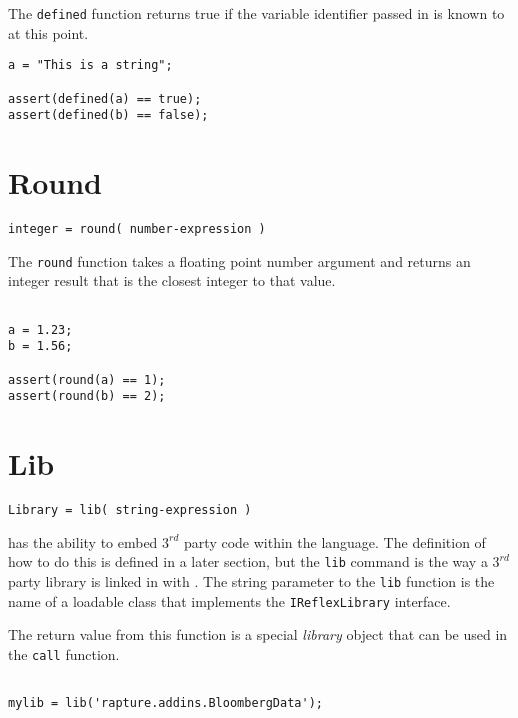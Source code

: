 The \Verb+defined+ function returns true if the variable identifier passed in is known to \Reflex at this point.

\begin{lstlisting}[caption={Defined example}]
a = "This is a string";

assert(defined(a) == true);
assert(defined(b) == false);

\end{lstlisting}

\section{Round}

\begin{Verbatim}
integer = round( number-expression )
\end{Verbatim}

The \Verb+round+ function takes a floating point number argument and returns an integer result that is the closest integer to that value.

\begin{lstlisting}[caption={Round example}]

a = 1.23;
b = 1.56;

assert(round(a) == 1);
assert(round(b) == 2);
\end{lstlisting}

\section{Lib}

\begin{Verbatim}
Library = lib( string-expression )
\end{Verbatim}

\Reflex has the ability to embed $3^{rd}$ party code within the language. The definition of how to do this is defined in a later section, but the \Verb+lib+ command is the way a $3^{rd}$ party library is linked in with \Reflex. The string parameter to the \verb+lib+ function is the name of a loadable class that implements the \verb+IReflexLibrary+ interface.

The return value from this function is a special \emph{library} object that can be used in the \Verb+call+ function.

\begin{lstlisting}[caption={Lib example}]

mylib = lib('rapture.addins.BloombergData');

\end{lstlisting}

